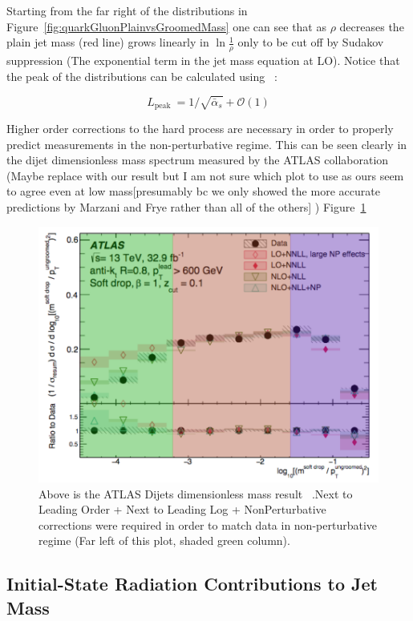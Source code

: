  Starting from the far right of the distributions in Figure~\ref{fig:quarkGluonPlainvsGroomedMass} one can see that as $\rho$ decreases the plain jet mass (red line) grows linearly in $\ln \frac{1}{\rho}$ only to be cut off by Sudakov suppression (The exponential term in the jet mass equation at LO). Notice that the peak of the distributions can be calculated using ~\cite{mmdt}:\newline

\begin{equation}
L_{\text {peak }}=1 / \sqrt{\bar{\alpha}_{s}}+\mathcal{O}(1)
\end{equation}
 




Higher order corrections to the hard process are necessary in order to properly predict measurements in the non-perturbative regime. This can be seen clearly in the dijet dimensionless mass spectrum measured by the ATLAS collaboration (Maybe replace with our result but I am not sure which plot to use as ours seem to agree even at low mass[presumably bc we only showed the more accurate predictions by Marzani and Frye rather than all of the others] ) Figure~\ref{fig:atlasDijet}


\begin{figure}[htb]
\centering
\includegraphics[width=.60\textwidth]{visuals/ATLAS-rho-highorder.png}
\caption{Above is the ATLAS Dijets dimensionless mass result ~\cite{Dreyer:2018nbf}.Next to Leading Order + Next to Leading Log + NonPerturbative corrections were required in order to match data in non-perturbative regime (Far left of this plot, shaded green column).}
\label{fig:atlasDijet}
\end{figure}






\subsection{Initial-State Radiation Contributions to Jet Mass }\label{sec:jetmassISR}


